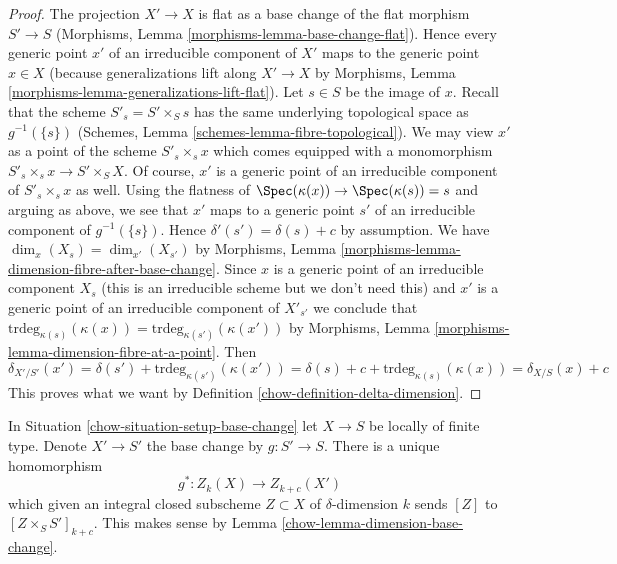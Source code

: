 \begin{proof}

The projection $X' \to X$ is flat as a base change of the flat morphism
$S' \to S$ (Morphisms, Lemma \ref{morphisms-lemma-base-change-flat}).
Hence every generic point $x'$ of an irreducible
component of $X'$ maps to the generic point $x \in X$ (because generalizations
lift along $X' \to X$ by
Morphisms, Lemma \ref{morphisms-lemma-generalizations-lift-flat}).
Let $s \in S$ be the image of $x$.
Recall that the scheme $S'_s = S' \times_S s$
has the same underlying topological space as $g^{-1}(\{s\})$
(Schemes, Lemma \ref{schemes-lemma-fibre-topological}).
We may view $x'$ as a point of the scheme $S'_s \times_s x$ which
comes equipped with a monomorphism $S'_s \times_s x \to S' \times_S X$.
Of course, $x'$ is a generic point of an irreducible component
of $S'_s \times_s x$ as well.
Using the flatness of $\Spec(\kappa(x)) \to \Spec(\kappa(s)) = s$
and arguing as above, we see that $x'$ maps to a generic point $s'$
of an irreducible component of $g^{-1}(\{s\})$. Hence
$\delta'(s') = \delta(s) + c$ by assumption.
We have $\dim_x(X_s) = \dim_{x'}(X_{s'})$ by
Morphisms, Lemma \ref{morphisms-lemma-dimension-fibre-after-base-change}.
Since $x$ is a generic point of an irreducible component $X_s$
(this is an irreducible scheme but we don't need this) and
$x'$ is a generic point of an irreducible component of $X'_{s'}$ we conclude
that $\text{trdeg}_{\kappa(s)}(\kappa(x)) =
\text{trdeg}_{\kappa(s')}(\kappa(x'))$
by Morphisms, Lemma \ref{morphisms-lemma-dimension-fibre-at-a-point}.
Then
$$
\delta_{X'/S'}(x') = \delta(s') + \text{trdeg}_{\kappa(s')}(\kappa(x')) =
\delta(s) + c + \text{trdeg}_{\kappa(s)}(\kappa(x)) = \delta_{X/S}(x) + c
$$
This proves what we want by Definition \ref{chow-definition-delta-dimension}.
\end{proof}

In Situation \ref{chow-situation-setup-base-change} let $X \to S$ be locally
of finite type. Denote $X' \to S'$ the base change by $g : S' \to S$.
There is a unique homomorphism
$$
g^* : Z_k(X) \longrightarrow Z_{k + c}(X')
$$
which given an integral closed subscheme $Z \subset X$ of
$\delta$-dimension $k$ sends $[Z]$ to $[Z \times_S S']_{k + c}$.
This makes sense by Lemma \ref{chow-lemma-dimension-base-change}.


